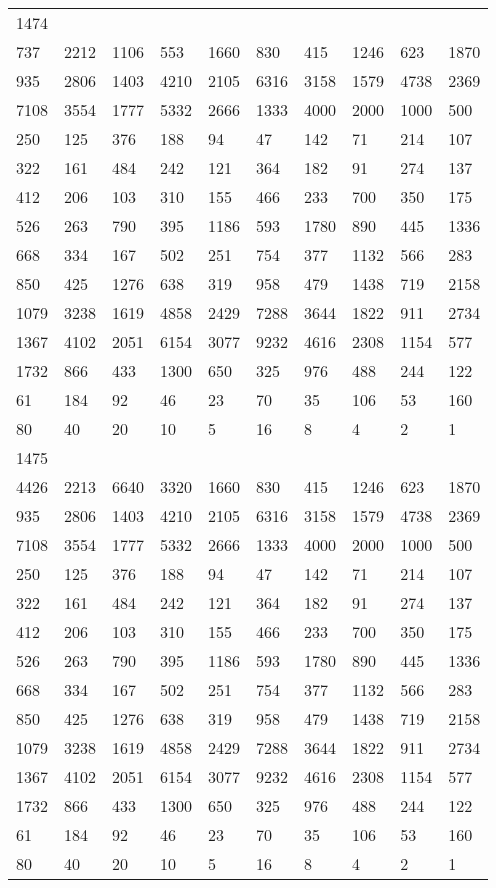 \begin{longtable}{*{10}{l}}
1474&&&&&&&&&\\
737& 2212& 1106& 553& 1660& 830& 415& 1246& 623& 1870\\
935& 2806& 1403& 4210& 2105& 6316& 3158& 1579& 4738& 2369\\
7108& 3554& 1777& 5332& 2666& 1333& 4000& 2000& 1000& 500\\
250& 125& 376& 188& 94& 47& 142& 71& 214& 107\\
322& 161& 484& 242& 121& 364& 182& 91& 274& 137\\
412& 206& 103& 310& 155& 466& 233& 700& 350& 175\\
526& 263& 790& 395& 1186& 593& 1780& 890& 445& 1336\\
668& 334& 167& 502& 251& 754& 377& 1132& 566& 283\\
850& 425& 1276& 638& 319& 958& 479& 1438& 719& 2158\\
1079& 3238& 1619& 4858& 2429& 7288& 3644& 1822& 911& 2734\\
1367& 4102& 2051& 6154& 3077& 9232& 4616& 2308& 1154& 577\\
1732& 866& 433& 1300& 650& 325& 976& 488& 244& 122\\
61& 184& 92& 46& 23& 70& 35& 106& 53& 160\\
80& 40& 20& 10& 5& 16& 8& 4& 2& 1\\

1475&&&&&&&&&\\
4426& 2213& 6640& 3320& 1660& 830& 415& 1246& 623& 1870\\
935& 2806& 1403& 4210& 2105& 6316& 3158& 1579& 4738& 2369\\
7108& 3554& 1777& 5332& 2666& 1333& 4000& 2000& 1000& 500\\
250& 125& 376& 188& 94& 47& 142& 71& 214& 107\\
322& 161& 484& 242& 121& 364& 182& 91& 274& 137\\
412& 206& 103& 310& 155& 466& 233& 700& 350& 175\\
526& 263& 790& 395& 1186& 593& 1780& 890& 445& 1336\\
668& 334& 167& 502& 251& 754& 377& 1132& 566& 283\\
850& 425& 1276& 638& 319& 958& 479& 1438& 719& 2158\\
1079& 3238& 1619& 4858& 2429& 7288& 3644& 1822& 911& 2734\\
1367& 4102& 2051& 6154& 3077& 9232& 4616& 2308& 1154& 577\\
1732& 866& 433& 1300& 650& 325& 976& 488& 244& 122\\
61& 184& 92& 46& 23& 70& 35& 106& 53& 160\\
80& 40& 20& 10& 5& 16& 8& 4& 2& 1\\


\end{longtable}
